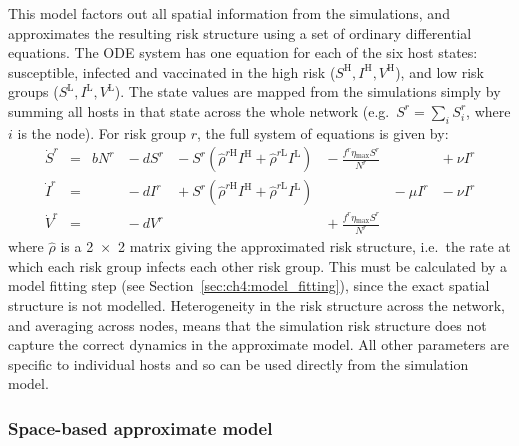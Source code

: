 This model factors out all spatial information from the simulations, and approximates the resulting risk structure using a set of ordinary differential equations. The ODE system has one equation for each of the six host states: susceptible, infected and vaccinated in the high risk ($S^\mathrm{H}, I^\mathrm{H}, V^\mathrm{H}$), and low risk groups ($S^\mathrm{L}, I^\mathrm{L}, V^\mathrm{L}$). The state values are mapped from the simulations simply by summing all hosts in that state across the whole network (e.g.\ $S^r = \sum_{i}S^r_i$, where $i$ is the node). For risk group $r$, the full system of equations is given by:
\begin{subequations}\label{eqn:ch4:risk_model}
\begin{alignat}{7}
    \dot{S}^r &={} &bN^r &{}-{} dS^r &{}-{} S^r\left(\hat{\rho}^{r\mathrm{H}}I^{\mathrm{H}} + \hat{\rho}^{r\mathrm{L}}I^{\mathrm{L}}\right) &{}-{} \frac{f^r\eta{}_\mathrm{max}S^r}{N^r} &&{}+{} \nu{}I^r \\
    \dot{I}^r &={}  &&{}-{} dI^r &{}+{} S^r\left(\hat{\rho}^{r\mathrm{H}}I^{\mathrm{H}} + \hat{\rho}^{r\mathrm{L}}I^{\mathrm{L}}\right)& &{}-{} \mu{}I^r &{}-{} \nu{}I^r \\
    \dot{V}^r &={}  &&{}-{} dV^r &&{}+{} \frac{f^r\eta{}_\mathrm{max}S^r}{N^r}&&
\end{alignat}
\end{subequations}
where $\hat{\rho}$ is a \num{2x2} matrix giving the approximated risk structure, i.e.\ the rate at which each risk group infects each other risk group. This must be calculated by a model fitting step (see Section~\ref{sec:ch4:model_fitting}), since the exact spatial structure is not modelled. Heterogeneity in the risk structure across the network, and averaging across nodes, means that the simulation risk structure does not capture the correct dynamics in the approximate model. All other parameters are specific to individual hosts and so can be used directly from the simulation model.

\subsubsection*{Space-based approximate model}

